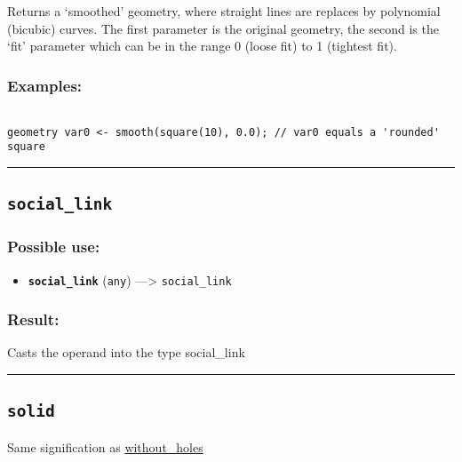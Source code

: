 \documentclass[]{book}
\providecommand{\tightlist}{%
  \setlength{\itemsep}{0pt}\setlength{\parskip}{0pt}}
\theoremstyle{definition}
\theoremstyle{definition}
\theoremstyle{definition}
\theoremstyle{remark}
\begin{document}
Returns a `smoothed' geometry, where straight lines are replaces by
polynomial (bicubic) curves. The first parameter is the original
geometry, the second is the `fit' parameter which can be in the range 0
(loose fit) to 1 (tightest fit).

\subsubsection{Examples:}\label{examples-338}

\begin{verbatim}
 
geometry var0 <- smooth(square(10), 0.0); // var0 equals a 'rounded' square
\end{verbatim}

\begin{center}\rule{0.5\linewidth}{\linethickness}\end{center}

\subsection{\texorpdfstring{\texttt{social\_link}}{social\_link}}\label{social_link}

\subsubsection{Possible use:}\label{possible-use-485}

\begin{itemize}
\tightlist
\item
  \textbf{\texttt{social\_link}} (\texttt{any}) ---\textgreater{}
  \texttt{social\_link}
\end{itemize}

\subsubsection{Result:}\label{result-469}

Casts the operand into the type social\_link

\begin{center}\rule{0.5\linewidth}{\linethickness}\end{center}

\subsection{\texorpdfstring{\texttt{solid}}{solid}}\label{solid}

Same signification as \href{OperatorsSZ\#without_holes}{without\_holes}
\end{document}
